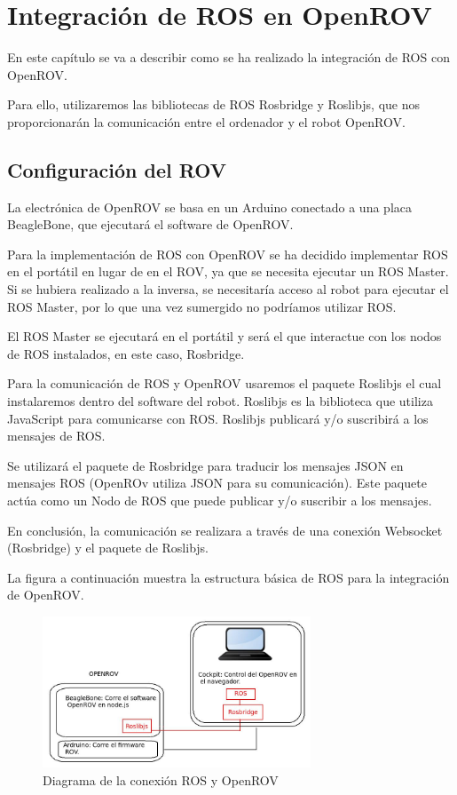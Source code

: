 \chapter{Integración de ROS en OpenROV}
\label{cap:integracionROS}

En este capítulo se va a describir como se ha realizado la integración de ROS con OpenROV\cite{ros_rov}.

Para ello, utilizaremos las bibliotecas de ROS Rosbridge y Roslibjs, que nos proporcionarán la comunicación entre el ordenador y el robot OpenROV.

\section{Configuración del ROV}
\label{cap:Configuracion del ROV}
La electrónica de OpenROV se basa en un Arduino conectado a una placa BeagleBone, que ejecutará el software de OpenROV.

Para la implementación de ROS con OpenROV se ha decidido implementar ROS en el portátil en lugar de en el ROV, ya que se necesita ejecutar un ROS Master. Si se hubiera realizado a la inversa, se necesitaría acceso al robot para ejecutar el ROS Master, por lo que una vez sumergido no podríamos utilizar ROS.

El ROS Master se ejecutará en el portátil y será el que interactue con los nodos de ROS instalados, en este caso, Rosbridge.

Para la comunicación de ROS y OpenROV usaremos el paquete Roslibjs el cual instalaremos dentro del software del robot. Roslibjs es la biblioteca que utiliza JavaScript para comunicarse con ROS. Roslibjs publicará y/o suscribirá a los mensajes de ROS.

Se utilizará el paquete de Rosbridge para traducir los mensajes JSON en mensajes ROS (OpenROv utiliza JSON para su comunicación). Este paquete actúa como un Nodo de ROS que puede publicar y/o suscribir a los mensajes.

En conclusión, la comunicación se realizara a través de una conexión Websocket (Rosbridge) y el paquete de Roslibjs.

La figura a continuación muestra la estructura básica de ROS para la integración de OpenROV.

\begin{figure} [hbtp]
  \begin{center}
    \includegraphics[width=8cm]{img/cap4/conect_ros_rov}
  \end{center}
  \caption{Diagrama de la conexión ROS y OpenROV}
  \label{fig:conect_ros_rov}
\end{figure}

